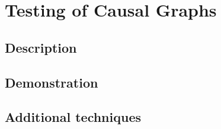 \section{Testing of Causal Graphs}
\label{sec:graph-testing}


\subsection{Description}
\label{sec:testing-description}


\subsection{Demonstration}
\label{sec:testing-demonstration}


\subsection{Additional techniques}
\label{sec:testing-addendum}
